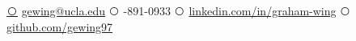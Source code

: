 \documentclass[letterpaper]{style} %
\def\ci#1{\textcircled{\resizebox{.5em}{!}{#1}}}
\begin{document}
{
\href{mailto:gewing@ucla.edu}{\ci{\faEnvelope}} {\fontsize{10}{10}\selectfont \href{mailto:gewing@ucla.edu}{gewing@ucla.edu}}
}
{
\ci{\faPhone}  {\fontsize{10}{10}-891-0933} 
}
{
\href{https://www.linkedin.com/in/graham-wing/}{\ci{\faLinkedin}}  \href{https://www.linkedin.com/in/graham-wing/}{\fontsize{10}{10}\selectfont linkedin.com/in/graham-wing}
}
{
\href{https://github.com/gewing97}{\ci{\faGithub}} \href{https://github.com/gewing97}{\fontsize{10}{10}\selectfont github.com/gewing97}    
}


% 
\end{document}
